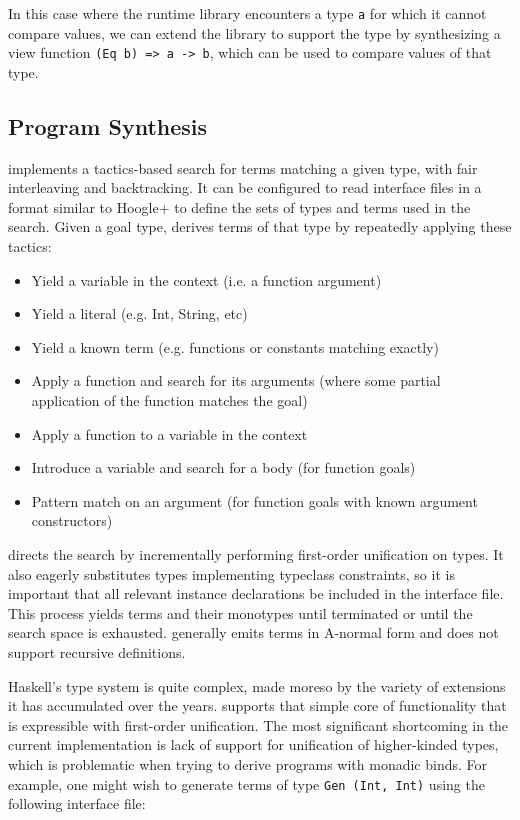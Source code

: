 In this case where the runtime library encounters a type \texttt{a} for which it
cannot compare values, we can extend the library to support the type by
synthesizing a view function \texttt{(Eq b) => a -> b}, which can be used to
compare values of that type.

\subsection{Program Synthesis}\label{sec:implementation:synthesis}

\Rulecheck implements a tactics-based search for terms matching a given type, with fair interleaving and backtracking. \cite{delahaye2000tactic, kiselyov2005backtracking} It can be configured to read interface files in a format similar to Hoogle+ \cite{james2020digging} to define the sets of types and terms used in the search. Given a goal type, \Rulecheck derives terms of that type by repeatedly applying these tactics:

\begin{itemize}
  \item Yield a variable in the context (i.e. a function argument)
  \item Yield a literal (e.g. Int, String, etc)
  \item Yield a known term (e.g. functions or constants matching exactly)
  \item Apply a function and search for its arguments (where some partial application of the function matches the goal)
  \item Apply a function to a variable in the context
  \item Introduce a variable and search for a body (for function goals)
  \item Pattern match on an argument (for function goals with known argument constructors)
\end{itemize}

\Rulecheck directs the search by incrementally performing first-order unification on types. It also eagerly substitutes types implementing typeclass constraints, so it is important that all relevant instance declarations be included in the interface file. This process yields terms and their monotypes until terminated or until the search space is exhausted. \Rulecheck generally emits terms in A-normal form and does not support recursive definitions.

Haskell's type system is quite complex, made moreso by the variety of extensions it has accumulated over the years. \Rulecheck supports that simple core of functionality that is expressible with first-order unification. The most significant shortcoming in the current implementation is lack of support for unification of higher-kinded types, which is problematic when trying to derive programs with monadic binds. For example, one might wish to generate terms of type \texttt{Gen (Int, Int)} using the following interface file:

